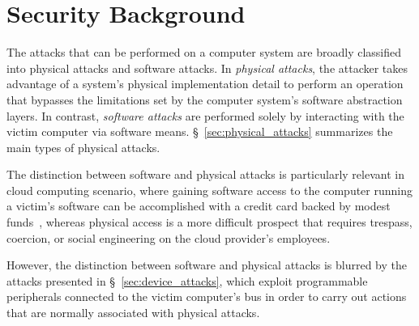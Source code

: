 \section{Security Background}
\label{sec:security_background}

The attacks that can be performed on a computer system are broadly classified
into physical attacks and software attacks. In \textit{physical attacks}, the
attacker takes advantage of a system's physical implementation detail to
perform an operation that bypasses the limitations set by the computer
system's software abstraction layers. In contrast, \textit{software attacks}
are performed solely by interacting with the victim computer via software
means. \S~\ref{sec:physical_attacks} summarizes the main types of physical
attacks.

The distinction between software and physical attacks is particularly relevant
in cloud computing scenario, where gaining software access to the computer
running a victim's software can be accomplished with a credit card backed by
modest funds~\cite{ristenpart2009colocation}, whereas physical access is a
more difficult prospect that requires trespass, coercion, or social engineering
on the cloud provider's employees.

However, the distinction between software and physical attacks is blurred by
the attacks presented in \S~\ref{sec:device_attacks}, which exploit
programmable peripherals connected to the victim computer's bus in order to
carry out actions that are normally associated with physical attacks.








